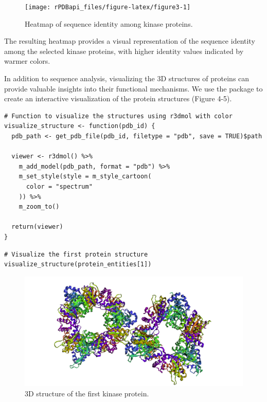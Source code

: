\begin{figure}[H]
\texttt{[image: rPDBapi\_files/figure-latex/figure3-1]} \caption{Heatmap of sequence identity among kinase proteins.}\label{fig:figure3}
\end{figure}

The resulting heatmap provides a visual representation of the sequence identity among the selected kinase proteins, with higher identity values indicated by warmer colors.

In addition to sequence analysis, visualizing the 3D structures of proteins can provide valuable insights into their functional mechanisms. We use the  package to create an interactive visualization of the protein structures (Figure 4-5).

\begin{verbatim}
# Function to visualize the structures using r3dmol with color
visualize_structure <- function(pdb_id) {
  pdb_path <- get_pdb_file(pdb_id, filetype = "pdb", save = TRUE)$path

  viewer <- r3dmol() %>%
    m_add_model(pdb_path, format = "pdb") %>%
    m_set_style(style = m_style_cartoon(
      color = "spectrum"
    )) %>%
    m_zoom_to()

  return(viewer)
}
\end{verbatim}

\begin{verbatim}
# Visualize the first protein structure
visualize_structure(protein_entities[1])
\end{verbatim}

\begin{figure}[H]

{\centering \includegraphics[width=1\linewidth,]{figures/figure4} 

}

\caption{3D structure of the first kinase protein.}\label{fig:figure4}
\end{figure}

